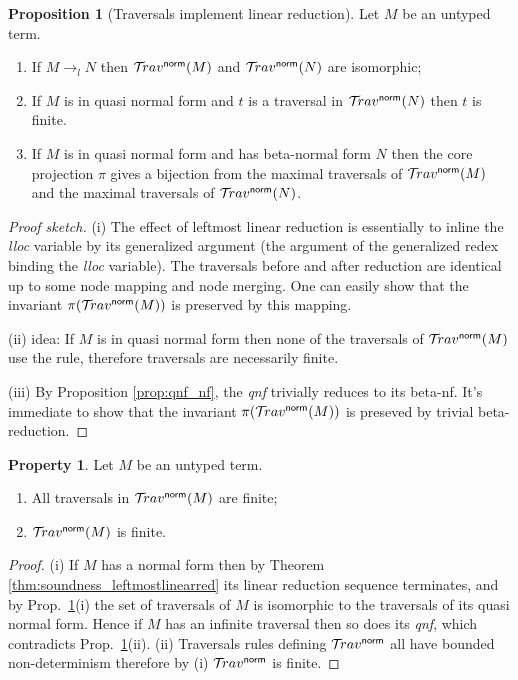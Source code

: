 \documentclass{article}
\theoremstyle{definition}
\newtheorem{property}{Property}[section]
\newtheorem{proposition}{Proposition}[section]
\newcommand{\normalizing}{{\sf norm}}
\newcommand{\travsetnorm}{\travset^\normalizing}
\def\coresymbol{\pi} %
\newcommand{\core}[1]{\coresymbol(#1)} %
\begin{document}
\begin{proposition}[Traversals implement linear reduction]
\label{prop:ulctrav_impl_linear_reduction}
Let $M$ be an untyped term.
\begin{enumerate}[label=(\roman*)]
\item If $M \rightarrow_l N$ then $\travsetnorm(M)$ and  $\travsetnorm(N)$ are isomorphic;
\item If $M$ is in quasi normal form and $t$ is a traversal in $\travsetnorm(N)$ then $t$ is finite.
\item If $M$ is in quasi normal form and has beta-normal form $N$ then the core projection $\coresymbol$ gives a bijection from the maximal traversals of $\travsetnorm(M)$ and the maximal traversals of $\travsetnorm(N)$.
\end{enumerate}
\end{proposition}
\begin{proof}[Proof sketch]
(i) The effect of leftmost linear reduction is essentially to inline the \emph{lloc} variable by its generalized argument (the argument of the generalized redex binding the \emph{lloc} variable).
The traversals before and after reduction are identical up to some node mapping and node merging. One can easily show that the invariant $\core{\travsetnorm(M)}$ is preserved by this mapping.

(ii) idea: If $M$ is in quasi normal form then none of the traversals of $\travsetnorm(M)$ use the  rule, therefore traversals are necessarily finite.

(iii) By Proposition \ref{prop:qnf_nf}, the \emph{qnf} trivially reduces to its beta-nf. It's immediate to show that the invariant $\core{\travsetnorm(M)}$ is preseved by trivial beta-reduction.

\end{proof}

\begin{property}
\label{prop:ulc_travnorm_finite}
Let $M$ be an untyped term.
\begin{enumerate}[label=(\roman*)]
\item All traversals in $\travsetnorm(M)$ are finite;
\item $\travsetnorm(M)$ is finite.
\end{enumerate}
\end{property}
\begin{proof}
(i) If $M$ has a normal form then by Theorem \ref{thm:soundness_leftmostlinearred} its linear reduction sequence terminates, and by Prop.~\ref{prop:ulctrav_impl_linear_reduction}(i) the set of traversals of $M$ is isomorphic to the traversals of its quasi normal form. Hence if $M$ has an infinite traversal then so does its \emph{qnf}, which contradicts Prop.~\ref{prop:ulctrav_impl_linear_reduction}(ii).
(ii) Traversals rules defining $\travsetnorm$ all have bounded non-determinism therefore by (i) $\travsetnorm$ is finite.
\end{proof}
\end{document}
